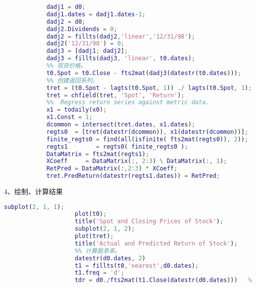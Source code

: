                 \begin{lstlisting}[language=Matlab]
                %% 创建收盘价调整series
            dadj1 = d0;
            dadj1.dates = dadj1.dates-1;
            dadj2 = d0;
            dadj2.Dividends = 0;
            dadj2 = fillts(dadj2,'linear','12/31/98');
            dadj2('12/31/98') = 0;
            dadj3 = [dadj1; dadj2];
            dadj3 = fillts(dadj3, 'linear', t0.dates);
            %% 现货价格。
            t0.Spot = t0.Close - fts2mat(dadj3(datestr(t0.dates)));
            %% 创建返回系列。
            tret = (t0.Spot - lagts(t0.Spot, 1)) ./ lagts(t0.Spot, 1);
            tret = chfield(tret, 'Spot', 'Return');
            %%  Regress return series against metric data.
            x1 = todaily(x0);
            x1.Const = 1;
            dcommon = intersect(tret.dates, x1.dates);
            regts0  = [tret(datestr(dcommon)), x1(datestr(dcommon))];
            finite_regts0 = find(all(isfinite( fts2mat(regts0)), 2));
            regts1        = regts0( finite_regts0 );
            DataMatrix = fts2mat(regts1);
            XCoeff     = DataMatrix(:, 2:3) \ DataMatrix(:, 1);
            RetPred = DataMatrix(:,2:3) * XCoeff;
            tret.PredReturn(datestr(regts1.dates)) = RetPred;
                \end{lstlisting}
            4、绘制、计算结果
                \begin{lstlisting}[language=Matlab]
                    subplot(2, 1, 1);
                    plot(t0);
                    title('Spot and Closing Prices of Stock');
                    subplot(2, 1, 2);
                    plot(tret);
                    title('Actual and Predicted Return of Stock');
                    %% 计算股息率。
                    datestr(d0.dates, 2)
                    t1 = fillts(t0,'nearest',d0.dates);
                    t1.freq = 'd';
                    tdr = d0./fts2mat(t1.Close(datestr(d0.dates)))   % Calculate the dividend rate
                \end{lstlisting}
